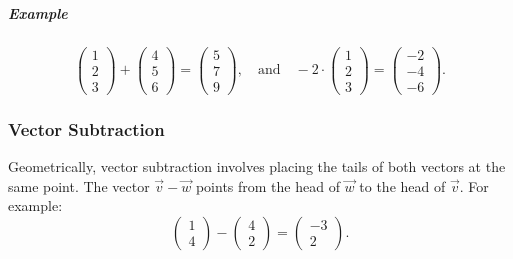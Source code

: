 \documentclass[a4paper,12pt]{article}
\begin{document}
\subparagraph{Example}
\[
\begin{pmatrix}
    1 \\
    2 \\
    3
\end{pmatrix}
+
\begin{pmatrix}
    4 \\
    5 \\
    6
\end{pmatrix}
=
\begin{pmatrix}
    5 \\
    7 \\
    9
\end{pmatrix},
\quad\text{and}\quad -2 \cdot \begin{pmatrix}
    1 \\
    2 \\
    3
\end{pmatrix}
=
\begin{pmatrix}
    -2 \\
    -4 \\
    -6
\end{pmatrix}.
\]

\subsubsection{Vector Subtraction}
Geometrically, vector subtraction involves placing the tails of both vectors at the same point. The vector $\vec{v} - \vec{w}$ points from the head of $\vec{w}$ to the head of $\vec{v}$. For example:
\[
\begin{pmatrix}
    1 \\
    4
\end{pmatrix}
-
\begin{pmatrix}
    4 \\
    2
\end{pmatrix}
=
\begin{pmatrix}
    -3 \\
    2
\end{pmatrix}.
\]

\begin{center}
\end{center}
\end{document}
